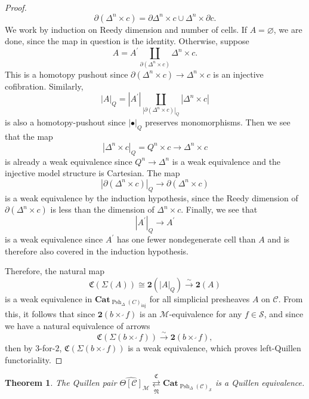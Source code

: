 \documentclass[a4paper]{article}
\numberwithin{equation}{subsection}
\theoremstyle{plain}   %
\newtheorem{thm}[equation]{Theorem}
\theoremstyle{definition}
\theoremstyle{remark}
\theoremstyle{plain}
\DeclareMathOperator{\Psh}{Psh}
\newcommand{\Cat}{\ensuremath{\mathbf{Cat}}}
\newcommand{\realiz}[1]{\ensuremath{\left\lvert#1\right\rvert}}
\providecommand{\C}{}
\renewcommand{\C}{\ensuremath{\mathcal{C}}}
\newcommand{\M}{\ensuremath{\mathcal{M}}}
\newcommand{\setS}{\ensuremath{\mathscr{S}}}
\newcommand{\cellset}{\ensuremath{\widehat{\Theta[\mathcal{C}]}}}
\begin{document}
\begin{proof}
  \[\partial(\Delta^n\times c)=\partial\Delta^n \times c \cup \Delta^n \times \partial c.\]
  We work by induction on Reedy dimension and number of cells.
  If \(A=\varnothing\), we are done, since the map in question is the identity.
  Otherwise, suppose
  \[A=A^\prime \coprod_{\partial(\Delta^n\times c)}  \Delta^n\times c.\]
  This is a homotopy pushout since \(\partial(\Delta^n \times c) \to \Delta^n\times c\) is an injective cofibration. Similarly, 
  \[\realiz{A}_Q=\realiz{A^\prime} \coprod_{\realiz{\partial(\Delta^n\times c)}_Q}  \realiz{\Delta^n\times c}\]
  is also a homotopy-pushout since \(\realiz{\bullet}_Q\) preserves monomorphisms.  Then we see that the map 
  \[\realiz{\Delta^n \times c}_Q=Q^n \times c \to \Delta^n\times c\] is already a weak equivalence since \(Q^n\to \Delta^n\) is a weak equivalence and the injective model structure is Cartesian.  The map 
  \[\realiz{\partial(\Delta^n \times c)}_Q \to \partial(\Delta^n \times c)\]
  is a weak equivalence by the induction hypothesis, since the Reedy dimension of \(\partial(\Delta^n \times c)\) is less than the dimension of \(\Delta^n \times c\). Finally, we see that 
  \[\realiz{A^\prime}_Q \to A^\prime\]
  is a weak equivalence since \(A^\prime\) has one fewer nondegenerate cell than \(A\) and is therefore also covered in the induction hypothesis.

  Therefore, the natural map
  \[\mathfrak{C}(\Sigma(A))\cong \mathbf{2}(\realiz{A}_Q) \xrightarrow{\sim} \mathbf{2}(A)\]
  is a weak equivalence in \(\Cat_{\Psh_{\Delta}(C)_{\mathrm{inj}}}\) for all simplicial presheaves \(A\) on \(\C\).
  From this, it follows that since \(\mathbf{2}(b\times^\lrcorner f)\) is an \(\M\)-equivalence for any \(f\in \setS\), and since we have a natural equivalence of arrows \[\mathfrak{C}(\Sigma(b\times^\lrcorner f))\xrightarrow{\sim} \mathbf{2}(b\times^\lrcorner f),\] then by \(3\)-for-\(2\), \(\mathfrak{C}(\Sigma(b\times^\lrcorner f))\) is a weak equivalence, which proves left-Quillen functoriality.
\end{proof}
\begin{thm}\label{maintheorem2}
  The Quillen pair \(\cellset_\M \underset{\mathfrak{N}}{\overset{\mathfrak{C}}{\rightleftarrows}} \Cat_{\Psh_{\Delta}(\C)_{\setS}}\) is a Quillen equivalence.
\end{thm}
\end{document}

